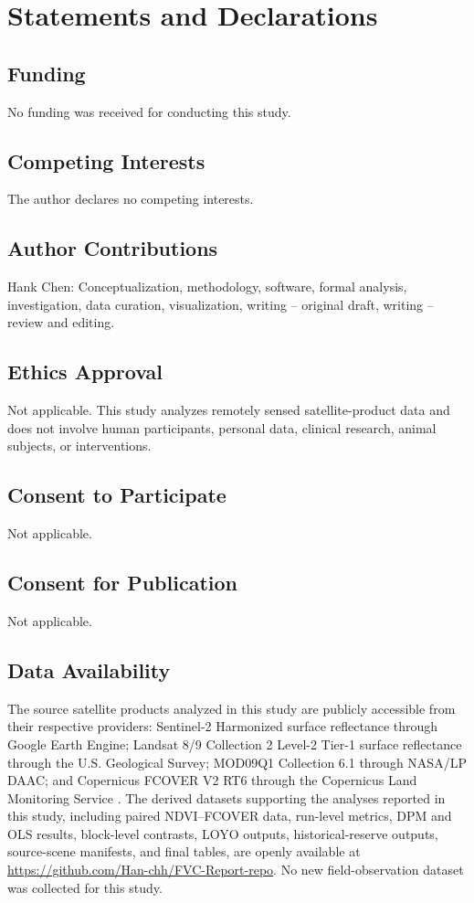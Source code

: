 \section*{Statements and Declarations}

\subsection*{Funding}
No funding was received for conducting this study.

\subsection*{Competing Interests}
The author declares no competing interests.

\subsection*{Author Contributions}
Hank Chen: Conceptualization, methodology, software, formal analysis, investigation, data curation, visualization, writing -- original draft, writing -- review and editing.

\subsection*{Ethics Approval}
Not applicable. This study analyzes remotely sensed satellite-product data and does not involve human participants, personal data, clinical research, animal subjects, or interventions.

\subsection*{Consent to Participate}
Not applicable.

\subsection*{Consent for Publication}
Not applicable.

\subsection*{Data Availability}
The source satellite products analyzed in this study are publicly accessible from their respective providers: Sentinel-2 Harmonized surface reflectance through Google Earth Engine; Landsat 8/9 Collection 2 Level-2 Tier-1 surface reflectance through the U.S. Geological Survey; MOD09Q1 Collection 6.1 through NASA/LP DAAC; and Copernicus FCOVER V2 RT6 through the Copernicus Land Monitoring Service \citep{s2harmonized,usgslandsat,mod09c61,copernicus2026pum}. The derived datasets supporting the analyses reported in this study, including paired NDVI--FCOVER data, run-level metrics, DPM and OLS results, block-level contrasts, LOYO outputs, historical-reserve outputs, source-scene manifests, and final tables, are openly available at \url{https://github.com/Han-chh/FVC-Report-repo}. No new field-observation dataset was collected for this study.

